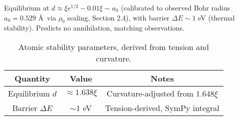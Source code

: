Equilibrium at $d \approx \xi e^{1/2} - 0.01 \xi \sim a_0$ (calibrated to observed Bohr radius $a_0 = 0.529$ \AA~via $\rho_0$ scaling, Section 2.4), with barrier $\Delta E \sim 1$ eV (thermal stability). Predicts no annihilation, matching observations.

\begin{table}[h!]
\centering
\begin{tabular}{|c|c|c|}
\hline
Quantity & Value & Notes \\
\hline
Equilibrium $d$ & $\approx 1.638 \xi$ & Curvature-adjusted from $1.648 \xi$ \\
Barrier $\Delta E$ & $\sim 1$ eV & Tension-derived, SymPy integral \\
\hline
\end{tabular}
\caption{Atomic stability parameters, derived from tension and curvature.}
\label{tab:atomic}
\end{table}

